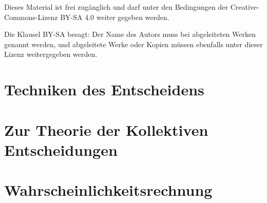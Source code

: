 \documentclass[12pt, a4paper, german]{book}
\numberwithin {equation}{section}
\begin{document}
\begin{titlepage}
\begin{center}
\vspace{0.5cm}

\begin{small}

Dieses Material ist frei zugänglich und darf unter den Bedingungen der
Creative-Commons-Lizenz BY-SA 4.0 weiter gegeben werden.

\vspace{0.5cm}

Die Klausel BY-SA besagt: Der Name des Autors muss bei abgeleiteten Werken
genannt werden, und abgeleitete Werke oder Kopien müssen ebenfalls unter
dieser Lizenz weitergegeben werden.

\end{small}

\end{center}

\end{titlepage}

\tableofcontents
\newpage 
 
\setlength{\marginparwidth}{2cm}



\chapter{Techniken des Entscheidens}


\newpage

 
\newpage
 
\newpage


\newpage

\newpage


\newpage

\newpage



\chapter{Zur Theorie der Kollektiven Entscheidungen}


\newpage


\newpage

\newpage




\chapter{Wahrscheinlichkeitsrechnung}
\end{document}
